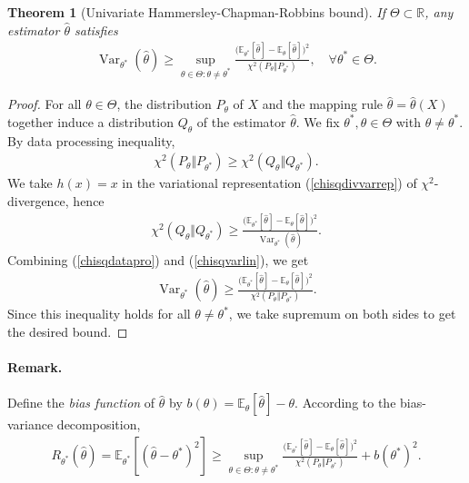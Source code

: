 \documentclass{article}
\numberwithin{equation}{section}
\newcommand{\E}{\mathbb{E}}
\newcommand{\bbR}{\mathbb{R}}
\newcommand{\wh}{\widehat}
\DeclareMathOperator{\var}{Var}
\theoremstyle{plain}
\newtheorem{theorem}{Theorem}[section]
\theoremstyle{definition}
\begin{document}
\begin{theorem}[Univariate Hammersley-Chapman-Robbins bound]
If $\Theta\subset\bbR$, any estimator $\wh\theta$ satisfies
\begin{align*}
\var_{\theta^*}(\wh{\theta})\geq\sup_{\theta\in\Theta:\theta\neq\theta^*}\frac{\bigl(\E_{\theta^*}[\wh{\theta}]-\E_{\theta}[\wh{\theta}]\bigr)^2}{\chi^2(P_\theta\Vert P_{\theta^*})},\quad\forall\theta^*\in\Theta.
\end{align*}
\end{theorem}
\begin{proof}
For all $\theta\in\Theta$, the distribution $P_\theta$ of $X$ and the mapping rule $\wh\theta=\wh\theta(X)$ together induce a distribution $Q_\theta$ of the estimator $\wh{\theta}$. We fix $\theta^*,\theta\in\Theta$ with $\theta\neq\theta^*$. By data processing inequality,
\begin{align}
	\chi^2(P_\theta\Vert P_{\theta^*})\geq\chi^2(Q_\theta\Vert Q_{\theta^*}).\label{chisqdatapro}
\end{align}
We take $h(x)=x$ in the variational representation (\ref{chisqdivvarrep}) of $\chi^2$-divergence, hence
\begin{align}
	\chi^2(Q_\theta\Vert Q_{\theta^*})\geq\frac{\bigl(\E_{\theta^*}[\wh{\theta}]-\E_{\theta}[\wh{\theta}]\bigr)^2}{\var_{\theta^*}(\wh{\theta})}.\label{chisqvarlin}
\end{align}
Combining (\ref{chisqdatapro}) and (\ref{chisqvarlin}), we get
\begin{align*}
	\var_{\theta^*}(\wh{\theta})\geq\frac{\bigl(\E_{\theta^*}[\wh{\theta}]-\E_{\theta}[\wh{\theta}]\bigr)^2}{\chi^2(P_\theta\Vert P_{\theta^*})}.
\end{align*}
Since this inequality holds for all $\theta\neq\theta^*$, we take supremum on both sides to get the desired bound.
\end{proof}
\paragraph{Remark.} Define the \textit{bias function} of $\wh\theta$ by $b(\theta)=\E_\theta[\wh{\theta}]-\theta$. According to the bias-variance decomposition,
\begin{align*}
	R_{\theta^*}(\wh{\theta})=\E_{\theta^*}[(\wh{\theta}-\theta^*)^2]\geq\sup_{\theta\in\Theta:\theta\neq\theta^*}\frac{\bigl(\E_{\theta^*}[\wh{\theta}]-\E_{\theta}[\wh{\theta}]\bigr)^2}{\chi^2(P_\theta\Vert P_{\theta^*})}+b(\theta^*)^2.
\end{align*}
\end{document}
